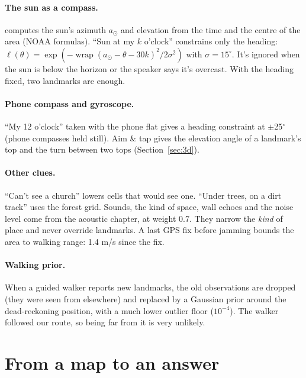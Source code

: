 \paragraph{The sun as a compass.}  computes the sun's azimuth $a_\odot$ and elevation from the
time and the centre of the area (NOAA formulas). ``Sun at my $k$ o'clock'' constrains only the heading:
$\ell(\theta) = \exp(-\operatorname{wrap}(a_\odot - \theta - 30k)^2/2\sigma^2)$ with $\sigma = 15^\circ$.
It's ignored when the sun is below the horizon or the speaker says it's overcast. With the heading fixed,
two landmarks are enough.

\paragraph{Phone compass and gyroscope.} ``My 12 o'clock'' taken with the phone flat gives a heading
constraint at $\pm$25$^\circ$ (phone compasses held still). Aim \& tap gives the elevation angle of a
landmark's top and the turn between two tops (Section~\ref{sec:3d}).

\paragraph{Other clues.} ``Can't see a church'' lowers cells that would see one. ``Under trees, on a dirt
track'' uses the forest grid. Sounds, the kind of space, wall echoes and the noise level come from the
acoustic chapter, at weight 0.7. They narrow the \emph{kind} of place and never override landmarks. A last
GPS fix before jamming bounds the area to walking range: 1.4 m/s since the fix.

\paragraph{Walking prior.} When a guided walker reports new landmarks, the old observations are dropped
(they were seen from elsewhere) and replaced by a Gaussian prior around the dead-reckoning position, with
a much lower outlier floor ($10^{-4}$). The walker followed our route, so being far from it is very unlikely.

\section{From a map to an answer}

